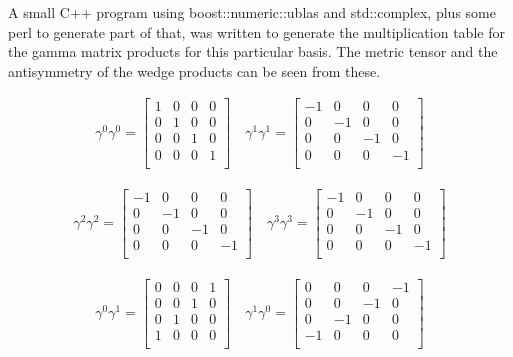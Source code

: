 A small C++ program using boost::numeric::ublas and std::complex,
plus some perl to generate part of that, was
written to generate the multiplication table for the gamma matrix products
for this particular basis.  The metric tensor and the antisymmetry of
the wedge products can be seen from these.





\begin{align*}
\gamma^0 \gamma^0 = \begin{bmatrix}
 1  &  0  &  0  &  0  \\
 0  &  1  &  0  &  0  \\
 0  &  0  &  1  &  0  \\
 0  &  0  &  0  &  1  \\
\end{bmatrix} \quad
\gamma^1 \gamma^1 = \begin{bmatrix}
 -1  &  0  &  0  &  0  \\
 0  &  -1  &  0  &  0  \\
 0  &  0  &  -1  &  0  \\
 0  &  0  &  0  &  -1  \\
\end{bmatrix}
\end{align*}

\begin{align*}
\gamma^2 \gamma^2 = \begin{bmatrix}
 -1  &  0  &  0  &  0  \\
 0  &  -1  &  0  &  0  \\
 0  &  0  &  -1  &  0  \\
 0  &  0  &  0  &  -1  \\
\end{bmatrix} \quad
\gamma^3 \gamma^3 = \begin{bmatrix}
 -1  &  0  &  0  &  0  \\
 0  &  -1  &  0  &  0  \\
 0  &  0  &  -1  &  0  \\
 0  &  0  &  0  &  -1  \\
\end{bmatrix}
\end{align*}

\begin{align*}
\gamma^0 \gamma^1 = \begin{bmatrix}
 0  &  0  &  0  &  1  \\
 0  &  0  &  1  &  0  \\
 0  &  1  &  0  &  0  \\
 1  &  0  &  0  &  0  \\
\end{bmatrix} \quad
\gamma^1 \gamma^0 = \begin{bmatrix}
 0  &  0  &  0  &  -1  \\
 0  &  0  &  -1  &  0  \\
 0  &  -1  &  0  &  0  \\
 -1  &  0  &  0  &  0  \\
\end{bmatrix}
\end{align*}

